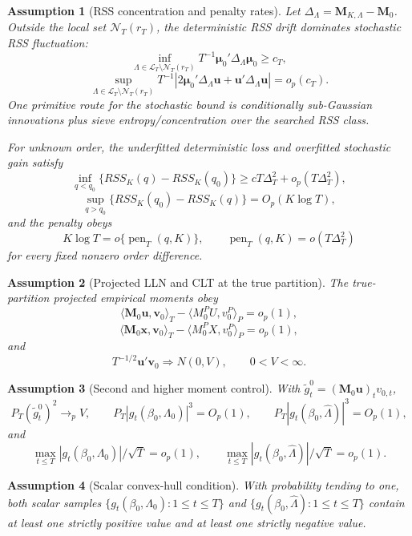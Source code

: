 \documentclass[12pt]{article}
\numberwithin{equation}{section}
\newtheorem{assumption}{Assumption}
\theoremstyle{definition}
\newcommand{\op}{o_p}
\newcommand{\Op}{O_p}
\newcommand{\innerT}[2]{\langle #1,#2\rangle_T}
\newcommand{\innerP}[2]{\langle #1,#2\rangle_P}
\begin{document}
\begin{assumption}[RSS concentration and penalty rates]
\label{ass:rss-localization-penalty}
Let \(\Delta_\Lambda=\bm M_{K,\Lambda}-\bm M_0\). Outside the local set
\(\mathcal N_T(r_T)\), the deterministic RSS drift dominates stochastic RSS
fluctuation:
\[
    \inf_{\Lambda\in\mathcal L_T\setminus\mathcal N_T(r_T)}
    T^{-1}\bm\mu_0'\Delta_\Lambda\bm\mu_0\ge c_T,
\]
\[
    \sup_{\Lambda\in\mathcal L_T\setminus\mathcal N_T(r_T)}
    T^{-1}|2\bm\mu_0'\Delta_\Lambda\bm u+\bm u'\Delta_\Lambda\bm u|=o_p(c_T).
\]
One primitive route for the stochastic bound is conditionally sub-Gaussian
innovations plus sieve entropy/concentration over the searched RSS class.

For unknown order, the underfitted deterministic loss and overfitted stochastic
gain satisfy
\[
    \inf_{q<q_0}\{RSS_K(q)-RSS_K(q_0)\}\ge cT\Delta_T^2+o_p(T\Delta_T^2),
\]
\[
    \sup_{q>q_0}\{RSS_K(q_0)-RSS_K(q)\}=\Op(K\log T),
\]
and the penalty obeys
\[
    K\log T=o\{\operatorname{pen}_T(q,K)\},
    \qquad
    \operatorname{pen}_T(q,K)=o(T\Delta_T^2)
\]
for every fixed nonzero order difference.
\end{assumption}

\begin{assumption}[Projected LLN and CLT at the true partition]
\label{ass:projected-lln-clt}
The true-partition projected empirical moments obey
\[
    \innerT{\bm M_0\bm u}{\bm v_0}
    -\innerP{M_0^PU}{v_0^P}=\op(1),
\]
\[
    \innerT{\bm M_0\bm x}{\bm v_0}
    -\innerP{M_0^PX}{v_0^P}=\op(1),
\]
and
\[
    T^{-1/2}\bm u'\bm v_0\Rightarrow N(0,V),
    \qquad 0<V<\infty.
\]
\end{assumption}

\begin{assumption}[Second and higher moment control]
\label{ass:moment-control}
With \(\tilde g_t^0=(\bm M_0\bm u)_t v_{0,t}\),
\[
    P_T(\tilde g_t^0)^2\to_p V,
    \qquad
    P_T|g_t(\beta_0,\Lambda_0)|^3=\Op(1),
    \qquad
    P_T|g_t(\beta_0,\widehat\Lambda)|^3=\Op(1),
\]
and
\[
    \max_{t\le T}|g_t(\beta_0,\Lambda_0)|/\sqrt T=\op(1),
    \qquad
    \max_{t\le T}|g_t(\beta_0,\widehat\Lambda)|/\sqrt T=\op(1).
\]
\end{assumption}

\begin{assumption}[Scalar convex-hull condition]
\label{ass:convex-hull}
With probability tending to one, both scalar samples
\(\{g_t(\beta_0,\Lambda_0):1\le t\le T\}\) and
\(\{g_t(\beta_0,\widehat\Lambda):1\le t\le T\}\) contain at least one strictly
positive value and at least one strictly negative value.
\end{assumption}
\end{document}
